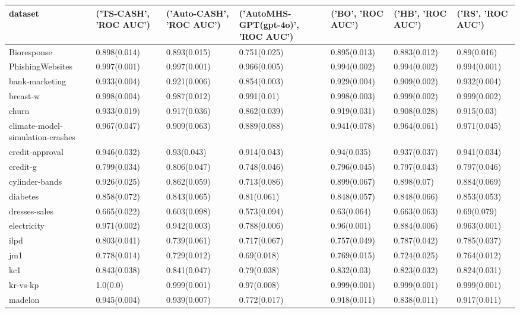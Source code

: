 \begin{tabular}{lllllll}
\toprule
dataset & ('TS-CASH', 'ROC AUC') & ('Auto-CASH', 'ROC AUC') & ('AutoMHS-GPT(gpt-4o)', 'ROC AUC') & ('BO', 'ROC AUC') & ('HB', 'ROC AUC') & ('RS', 'ROC AUC') \\
\midrule
Bioresponse & 0.898(0.014) & 0.893(0.015) & 0.751(0.025) & 0.895(0.013) & 0.883(0.012) & 0.89(0.016) \\
PhishingWebsites & 0.997(0.001) & 0.997(0.001) & 0.966(0.005) & 0.994(0.002) & 0.994(0.002) & 0.994(0.001) \\
bank-marketing & 0.933(0.004) & 0.921(0.006) & 0.854(0.003) & 0.929(0.004) & 0.909(0.002) & 0.932(0.004) \\
breast-w & 0.998(0.004) & 0.987(0.012) & 0.991(0.01) & 0.998(0.003) & 0.999(0.002) & 0.999(0.002) \\
churn & 0.933(0.019) & 0.917(0.036) & 0.862(0.039) & 0.919(0.031) & 0.908(0.028) & 0.915(0.03) \\
climate-model-simulation-crashes & 0.967(0.047) & 0.909(0.063) & 0.889(0.088) & 0.941(0.078) & 0.964(0.061) & 0.971(0.045) \\
credit-approval & 0.946(0.032) & 0.93(0.043) & 0.914(0.043) & 0.94(0.035) & 0.937(0.037) & 0.941(0.034) \\
credit-g & 0.799(0.034) & 0.806(0.047) & 0.748(0.046) & 0.796(0.045) & 0.797(0.043) & 0.797(0.046) \\
cylinder-bands & 0.926(0.025) & 0.862(0.059) & 0.713(0.086) & 0.899(0.067) & 0.898(0.07) & 0.884(0.069) \\
diabetes & 0.858(0.072) & 0.843(0.065) & 0.81(0.061) & 0.848(0.057) & 0.848(0.066) & 0.853(0.053) \\
dresses-sales & 0.665(0.022) & 0.603(0.098) & 0.573(0.094) & 0.63(0.064) & 0.663(0.063) & 0.69(0.079) \\
electricity & 0.971(0.002) & 0.942(0.003) & 0.788(0.006) & 0.96(0.001) & 0.884(0.006) & 0.963(0.001) \\
ilpd & 0.803(0.041) & 0.739(0.061) & 0.717(0.067) & 0.757(0.049) & 0.787(0.042) & 0.785(0.037) \\
jm1 & 0.778(0.014) & 0.729(0.012) & 0.69(0.018) & 0.769(0.015) & 0.724(0.025) & 0.764(0.012) \\
kc1 & 0.843(0.038) & 0.841(0.047) & 0.79(0.038) & 0.832(0.03) & 0.823(0.032) & 0.824(0.031) \\
kr-vs-kp & 1.0(0.0) & 0.999(0.001) & 0.97(0.008) & 0.999(0.001) & 0.999(0.001) & 0.999(0.001) \\
madelon & 0.945(0.004) & 0.939(0.007) & 0.772(0.017) & 0.918(0.011) & 0.838(0.011) & 0.917(0.011) \\

\end{tabular}
